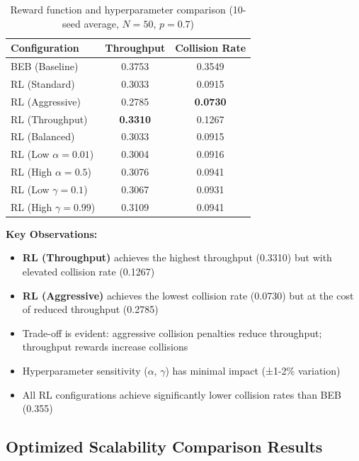 \documentclass[12pt,a4paper,oneside]{article}
\theoremstyle{definition}
\begin{document}
\begin{table}[H]
    \centering
    \begin{tabular}{|l|c|c|}
        \hline
        \textbf{Configuration} & \textbf{Throughput} & \textbf{Collision Rate} \\
        \hline
        BEB (Baseline) & 0.3753 & 0.3549 \\
        \hline
        RL (Standard) & 0.3033 & 0.0915 \\
        RL (Aggressive) & 0.2785 & \textbf{0.0730} \\
        RL (Throughput) & \textbf{0.3310} & 0.1267 \\
        RL (Balanced) & 0.3033 & 0.0915 \\
        \hline
        RL (Low $\alpha=0.01$) & 0.3004 & 0.0916 \\
        RL (High $\alpha=0.5$) & 0.3076 & 0.0941 \\
        \hline
        RL (Low $\gamma=0.1$) & 0.3067 & 0.0931 \\
        RL (High $\gamma=0.99$) & 0.3109 & 0.0941 \\
        \hline
    \end{tabular}
    \caption{Reward function and hyperparameter comparison (10-seed average, $N=50$, $p=0.7$)}
    \label{tab:reward_data}
\end{table}

\textbf{Key Observations:}
\begin{itemize}
    \item \textbf{RL (Throughput)} achieves the highest throughput (0.3310) but with elevated collision rate (0.1267)
    \item \textbf{RL (Aggressive)} achieves the lowest collision rate (0.0730) but at the cost of reduced throughput (0.2785)
    \item Trade-off is evident: aggressive collision penalties reduce throughput; throughput rewards increase collisions
    \item Hyperparameter sensitivity ($\alpha$, $\gamma$) has minimal impact (±1-2\% variation)
    \item All RL configurations achieve significantly lower collision rates than BEB (0.355)
\end{itemize}

\subsection{Optimized Scalability Comparison Results}
\end{document}

